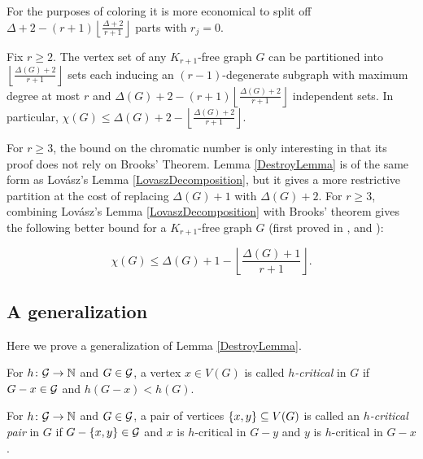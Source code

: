 \noindent For the purposes of coloring it is more economical to split off $\Delta + 2 - (r+1)\left \lfloor \frac{\Delta + 2}{r + 1} \right \rfloor$ parts with $r_j = 0$.

\begin{cor}
Fix $r \geq 2$.  The vertex set of any $K_{r + 1}$-free graph $G$ can be partitioned into $\left \lfloor \frac{\Delta(G) + 2}{r + 1} \right \rfloor$ sets each inducing an $(r-1)$-degenerate subgraph with maximum degree at most $r$ and $\Delta(G) + 2 - (r+1)\left \lfloor \frac{\Delta(G) + 2}{r + 1} \right \rfloor$ independent sets.  In particular, $\chi(G) \leq \Delta(G) + 2 - \left \lfloor \frac{\Delta(G) + 2}{r + 1} \right \rfloor$.
\end{cor}

For $r \geq 3$, the bound on the chromatic number is only interesting in that its proof does not rely on Brooks' Theorem.  
Lemma \ref{DestroyLemma} is of the same form as Lov\'{a}sz's Lemma
\ref{LovaszDecomposition}, but it gives a more restrictive partition at the cost
of replacing $\Delta(G) + 1$ with $\Delta(G) + 2$.  For $r \geq 3$, combining Lov\'{a}sz's Lemma
\ref{LovaszDecomposition} with Brooks' theorem gives the following better bound for a $K_{r + 1}$-free graph $G$ (first proved in \cite{borodin1977upper}, \cite{catlin1978bound} and \cite{lawrence1978covering}):

\[\chi(G) \leq \Delta(G) + 1 - \left \lfloor \frac{\Delta(G) + 1}{r + 1} \right \rfloor.\]

\bigskip

\subsection{A generalization}
Here we prove a generalization of Lemma \ref{DestroyLemma}.  

\begin{defn}
For $h\colon \mathcal{G} \rightarrow \mathbb{N}$ and $G \in \mathcal{G}$, a vertex $x \in V(G)$ is called \emph{$h$-critical} in $G$ if $G - x \in \mathcal{G}$ and $h(G-x) < h(G)$.
\end{defn}

\begin{defn}
For $h\colon \mathcal{G} \rightarrow \mathbb{N}$ and $G \in \mathcal{G}$, a pair of vertices $\left\{ x,y \right\} \subseteq V(G)$ is called an \emph{$h$-critical pair} in $G$ if $G - \left\{ x,y \right\} \in \mathcal{G}$ and $x$ is $h$-critical in $G-y$ and $y$ is $h$-critical in $G-x$.
\end{defn}

